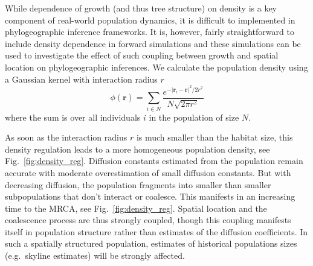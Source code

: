 \documentclass[aps,rmp, twocolumn]{revtex4}
\newcommand{\rvec}{\mathbf{r}}
\begin{document}
While dependence of growth (and thus tree structure) on density is a key component of real-world population dynamics, it is difficult to implemented in phylogeographic inference frameworks.
It is, however, fairly straightforward to include density dependence in forward simulations and these simulations can be used to investigate the effect of such coupling between growth and spatial location on phylogeographic inferences.
We calculate the population density using a Gaussian kernel with interaction radius $r$
\begin{equation}
    \phi(\rvec) = \sum_{i\in N} \frac{e^{-|\rvec_i - \rvec|^2/2r^2}}{N\sqrt{2\pi r^2}}
\end{equation}
where the sum is over all individuals $i$ in the population of size $N$.

As soon as the interaction radius $r$ is much smaller than the habitat size, this density regulation leads to a more homogeneous population density, see Fig.~\ref{fig:density_reg}.
Diffusion constants estimated from the population remain accurate with moderate overestimation of small diffusion constants.
But with decreasing diffusion, the population fragments into smaller than smaller subpopulations that don't interact or coalesce.
This manifests in an increasing time to the MRCA, see Fig.~\ref{fig:density_reg}.
Spatial location and the coalescence process are thus strongly coupled, though this coupling manifests itself in population structure rather than estimates of the diffusion coefficients.
In such a spatially structured population, estimates of historical populations sizes (e.g.~skyline estimates) will be strongly affected. 
\end{document}
